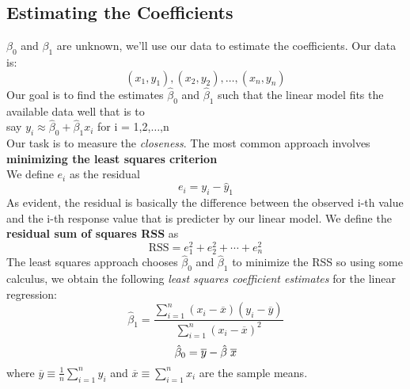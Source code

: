 \documentclass{article}
\begin{document}
\subsection*{Estimating the Coefficients} 
$\beta_0$ and $\beta_1$ are unknown, we'll use our data to estimate the coefficients. Our data is:\\
\begin{equation*} (x_1,y_1),(x_2,y_2),\dots,(x_n,y_n) \end{equation*} 
Our goal is to find the estimates $\hat{\beta}_0$ and $\hat{\beta}_1$ such that the linear model fits the available data well that is to \\[2pt] say $y_i \approx \hat{\beta}_0 + \hat{\beta}_1 x_i$ for i = 1,2,$\dots$,n 
\\ Our task is to measure the \textit{closeness}. The most common approach involves \textbf{minimizing the least squares criterion} 
\\
We define $e_i$ as the residual \begin{equation*} e_i = y_i - \hat{y}_1 \end{equation*}
As evident, the residual is basically the difference between the observed i-th value and the i-th response value that is predicter by our linear model. We define the \textbf{residual sum of squares RSS} as 
\begin{equation*} \text{RSS} = e_1^{2} + e_2^{2} + \cdots + e_n^{2} \end{equation*}
The least squares approach chooses $\hat{\beta}_0$ and $\hat{\beta}_1$ to minimize the RSS so using some calculus, we obtain the following \textit{least squares coefficient estimates} for the linear regression:
\begin{equation*} \hat{\beta}_1 = \frac{{\sum_{i=1}^{n}(x_i - \overline{x})}(y_i - \overline{y})}{{\sum_{i=1}^{n}{(x_i - \overline{x})}^{2}}}\end{equation*}
\begin{equation*} \hat{\beta}_0 = \overline{y} - \hat{\beta} \hspace{1mm} \overline{x} \end{equation*}
where $\overline{y} \equiv \frac{1}{n} \sum_{i=1}^{n} y_i$ and $\overline{x} \equiv \sum_{i=1}^{n} x_i$ are the sample means. 
\vspace{4mm}
\end{document}
